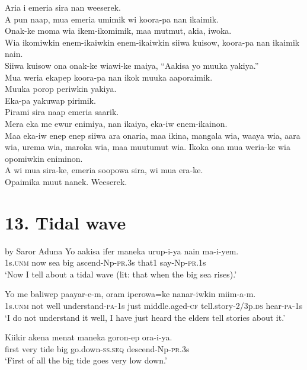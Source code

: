 Aria i emeria sira nan weeserek. \\
A pun naap, mua emeria umimik wi koora-pa nan ikaimik. \\
Onak-ke moma wia ikem-ikomimik, maa mutmut, akia, iwoka. \\
Wia ikomiwkin enem-ikaiwkin enem-ikaiwkin siiwa kuisow, koora-pa nan ikaimik nain. \\
Siiwa kuisow ona onak-ke wiawi-ke maiya, “Aakisa yo muuka yakiya.” \\
Mua weria ekapep koora-pa nan ikok muuka aaporaimik. \\
Muuka porop periwkin yakiya. \\
Eka-pa yakuwap pirimik. \\
Pirami sira naap emeria saarik. \\
Mera eka me ewur enimiya, nan ikaiya, eka-iw enem-ikainon. \\
\textrm{Maa eka-iw enep enep siiwa ara onaria, maa ikina, mangala wia, waaya wia, aara wia, urema wia, maroka wia, maa muutumut wia.}
Ikoka ona mua weria-ke wia opomiwkin eniminon. \\
A wi mua sira-ke, emeria soopowa sira, wi mua era-ke. \\
\textrm{Opaimika muut nanek. }
Weeserek. \\
\section{13. Tidal wave}
 by Saror Aduna
\ea\label{ex:a:x1}
\gll  Yo  aakisa  ifer  maneka  urup-i-ya  nain  ma-i-yem. \\
1s.\textsc{unm}  now  sea  big  ascend-Np-\textsc{pr}.3s  that1  say-Np-\textsc{pr}.1s \\
\glt ‘Now I tell about a tidal wave (lit: that when the big sea rises).’ \\
\z


\ea\label{ex:a:x2}
\gll  Yo  me  baliwep  paayar-e-m,  oram  iperowa=ke      nanar-iwkin  miim-a-m. \\
1s.\textsc{unm}  not  well  understand-\textsc{pa}-1s  just  middle.aged-\textsc{cf} tell.story-2/3p.\textsc{ds}  hear-\textsc{pa}-1s \\


\glt ‘I do not understand it well, I have just heard the elders tell stories about it.’ \\
\z


\ea\label{ex:a:x3}
\gll  Kiikir  akena  menat  maneka  goron-ep  ora-i-ya. \\
first  very  tide  big  go.down-\textsc{ss.seq}  descend-Np-\textsc{pr}.3s \\
\glt ‘First of all the big tide goes very low down.’ \\
\z


